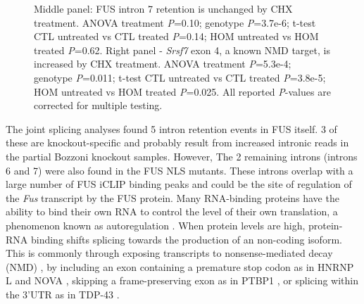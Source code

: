 \begin{figure}[h!]
{	Middle panel: FUS intron 7 retention is unchanged by CHX treatment. ANOVA treatment \textit{P}=0.10; genotype \textit{P}=3.7e-6; t-test CTL untreated vs CTL treated \textit{P}=0.14; HOM untreated vs HOM treated \textit{P}=0.62.
	Right panel - \textit{Srsf7} exon 4, a known NMD target, is increased by CHX treatment. ANOVA treatment \textit{P}=5.3e-4; genotype \textit{P}=0.011; t-test CTL untreated vs CTL treated \textit{P}=3.8e-5; HOM untreated vs HOM treated \textit{P}=0.025.
	All reported \textit{P}-values are corrected for multiple testing.
	}	
	\label{fig:fus_autoregulation}
\end{figure}


The joint splicing analyses found 5 intron retention events in FUS itself.
3 of these are knockout-specific and probably result from increased intronic reads in the partial Bozzoni knockout samples. 
However, The 2 remaining introns (introns 6 and 7) were also found in the FUS NLS mutants.
These introns overlap with a large number of FUS iCLIP binding peaks and could be the site of regulation of the \textit{Fus} transcript by the FUS protein.
Many RNA-binding proteins have the ability to bind their own RNA to control the level of their own translation, a phenomenon known as autoregulation \citep{Rosenfeld2002,Jangi2014a}.
When protein levels are high, protein-RNA binding shifts splicing towards the production of an non-coding isoform.
This is commonly through exposing transcripts to nonsense-mediated decay (NMD) \citep{McGlincy2008-wh}, by including an exon containing a premature stop codon as in HNRNP L and NOVA \citep{Rossbach2009,Dredge2005}, skipping a frame-preserving exon as in PTBP1 \citep{Wollerton2004}, or splicing within the 3'UTR as in TDP-43 \citep{Ayala2011}. 

